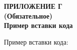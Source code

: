 \clearpage
{}%
\par

\normalsize
\begin{center}
  \textbf{ПРИЛОЖЕНИЕ Г} \\
  \textbf{(Обязательное)} \\
  \textbf{Пример вставки кода}
\end{center}

Пример вставки кода:

% 


\pdfpagewidth=210mm
\pdfpageheight=297mm

\clearpage
